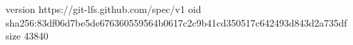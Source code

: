 version https://git-lfs.github.com/spec/v1
oid sha256:83df06d7be5de676360559564b0617c2c9b41cd350517c642493d843d2a735df
size 43840
